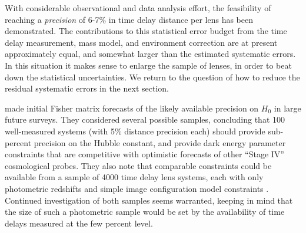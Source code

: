 With considerable observational and data analysis effort, the
feasibility of reaching a {\it precision} of 6-7\% in time delay distance
per lens has been demonstrated. The contributions to this statistical
error budget
from the time delay measurement, mass model, and environment
correction are at present approximately equal, and somewhat larger than
the estimated systematic errors. In this situation it makes sense to
enlarge the sample of lenses, in order to beat down the statistical
uncertainties. We return to the question of how to reduce the residual
systematic errors in the next section.

\citet{C+M09b} made initial Fisher matrix forecasts of the likely
available precision on $H_0$ in large future surveys. They considered
several possible samples, concluding that 100 well-measured systems
(with 5\% distance precision each) should provide sub-percent precision
on the Hubble constant, and provide  dark energy parameter constraints
that are competitive with optimistic forecasts of other ``Stage IV''
cosmological probes. They also note that comparable constraints could be
available from a sample of 4000 time delay lens systems, each with only
photometric redshifts and simple image configuration model constraints
\citep[following][]{Ogu07b,P+J10}.  Continued investigation of both samples
seems warranted, keeping in mind that the size of such a photometric
sample would be set by the availability of time delays measured at the
few percent level.

